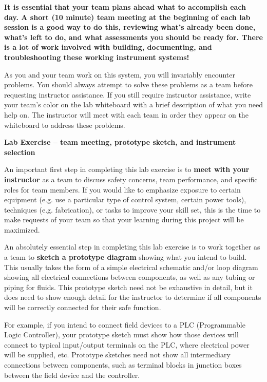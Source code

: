 \documentclass[12pt,a4paper]{article}
\begin{document}
\begin{itemize}
\vskip 10pt

{\bf It is essential that your team plans ahead what to accomplish each day.  A short (10 minute) team meeting at the beginning of each lab session is a good way to do this, reviewing what's already been done, what's left to do, and what assessments you should be ready for.  There is a lot of work involved with building, documenting, and troubleshooting these working instrument systems!}

As you and your team work on this system, you will invariably encounter problems.  You should always attempt to solve these problems as a team before requesting instructor assistance.  If you still require instructor assistance, write your team's color on the lab whiteboard with a brief description of what you need help on.  The instructor will meet with each team in order they appear on the whiteboard to address these problems.




\vfil \eject

\noindent
{\bf Lab Exercise -- team meeting, prototype sketch, and instrument selection}

\vskip 5pt

An important first step in completing this lab exercise is to {\bf meet with your instructor} as a team to discuss safety concerns, team performance, and specific roles for team members.  If you would like to emphasize exposure to certain equipment (e.g. use a particular type of control system, certain power tools), techniques (e.g. fabrication), or tasks to improve your skill set, this is the time to make requests of your team so that your learning during this project will be maximized.

\vskip 10pt

An absolutely essential step in completing this lab exercise is to work together as a team to {\bf sketch a prototype diagram} showing what you intend to build.  This usually takes the form of a simple electrical schematic and/or loop diagram showing all electrical connections between components, as well as any tubing or piping for fluids.  This prototype sketch need not be exhaustive in detail, but it does need to show enough detail for the instructor to determine if all components will be correctly connected for their safe function.

For example, if you intend to connect field devices to a PLC (Programmable Logic Controller), your prototype sketch must show how those devices will connect to typical input/output terminals on the PLC, where electrical power will be supplied, etc.  Prototype sketches need not show all intermediary connections between components, such as terminal blocks in junction boxes between the field device and the controller.


\end{itemize}
\end{document}
